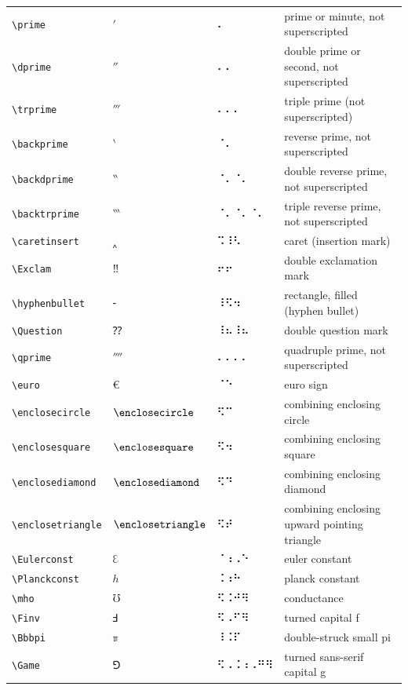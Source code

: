 \documentclass[oneside]{article}
\begin{document}
\begin{longtable}{llll}
\verb|\prime| & $\prime$ &  ⠄  & {prime or minute, not superscripted} \\[2ex]
\verb|\dprime| & $\dprime$ &  ⠄⠄  & {double prime or second, not superscripted} \\[2ex]
\verb|\trprime| & $\trprime$ &  ⠄⠄⠄  & {triple prime (not superscripted)} \\[2ex]
\verb|\backprime| & $\backprime$ &  ⠈⠄  & {reverse prime, not superscripted} \\[2ex]
\verb|\backdprime| & $\backdprime$ &  ⠈⠄⠈⠄  & {double reverse prime, not superscripted} \\[2ex]
\verb|\backtrprime| & $\backtrprime$ &  ⠈⠄⠈⠄⠈⠄  & {triple reverse prime, not superscripted} \\[2ex]
\verb|\caretinsert| & $\caretinsert$ &   ⠩⠸⠣  & {caret (insertion mark)} \\[2ex]
\verb|\Exclam| & $\Exclam$ &  ⠖⠖  & {double exclamation mark} \\[2ex]
\verb|\hyphenbullet| & $\hyphenbullet$ &  ⠸⠫⠲  & {rectangle, filled (hyphen bullet)} \\[2ex]
\verb|\Question| & $\Question$ &  ⠸⠦⠸⠦  & {double question mark} \\[2ex]
\verb|\qprime| & $\qprime$ &  ⠄⠄⠄⠄  & {quadruple prime, not superscripted} \\[2ex]
\verb|\euro| & $\euro$ &  ⠈⠑  & {euro sign} \\[2ex]
\verb|\enclosecircle| & $\enclosecircle$ &  ⠫⠉  & {combining enclosing circle} \\[2ex]
\verb|\enclosesquare| & $\enclosesquare$ &  ⠫⠲  & {combining enclosing square} \\[2ex]
\verb|\enclosediamond| & $\enclosediamond$ &  ⠫⠙  & {combining enclosing diamond} \\[2ex]
\verb|\enclosetriangle| & $\enclosetriangle$ &  ⠫⠞  & {combining enclosing upward pointing triangle} \\[2ex]
\verb|\Eulerconst| & $\Eulerconst$ &  ⠈⠰⠠⠑  & {euler constant} \\[2ex]
\verb|\Planckconst| & $\Planckconst$ &  ⠨⠰⠓  & {planck constant} \\[2ex]
\verb|\mho| & $\mho$ &  ⠫⠨⠚⠻  & {conductance} \\[2ex]
\verb|\Finv| & $\Finv$ &  ⠫⠠⠋⠻  & {turned capital f} \\[2ex]
\verb|\Bbbpi| & $\Bbbpi$ &  ⠸⠨⠏  & {double-struck small pi} \\[2ex]
\verb|\Game| & $\Game$ &  ⠫⠠⠨⠰⠠⠛⠻  & {turned sans-serif capital g} \\[2ex]

\end{longtable}
\end{document}
